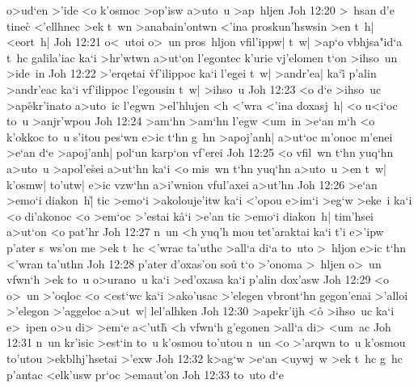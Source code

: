 o>ud`en
>'ide
<o
k'osmoc
>op'isw
a>uto~u
>ap~hljen\bibvsend
\vs Joh 12:20
>~hsan
d'e
tinec\r{}
<'ellhnec
>ek
t~wn
>anabain'ontwn
<'ina
proskun'hswsin
>en
t~h|
<eort~h|\bibvsend
\vs Joh 12:21
o<~utoi
o>~un
pros~hljon
vfil'ippw|
t~w|
>ap`o
vbhjsa"id`a
t~hc
galila'iac
ka`i
>hr'wtwn
a>ut`on
l'egontec
k'urie
vj'elomen
t`on
>ihso~un
>ide~in\bibvsend
\vs Joh 12:22
>'erqetai
\r{vf}'ilippoc
ka`i
l'egei
t~w|
>andr'ea|
ka`i\r{}
p'alin
>andr'eac
ka`i
vf'ilippoc
l'egousin
t~w|
>ihso~u\bibvsend
\vs Joh 12:23
<o
d`e
>ihso~uc
>ap\r{e}kr'inato
a>uto~ic
l'egwn
>el'hlujen
<h
<'wra
<'ina
doxasj~h|
<o
u<i`oc
to~u
>anjr'wpou\bibvsend
\vs Joh 12:24
>am`hn
>am`hn
l'egw
<um~in
>e`an
m`h
<o
k'okkoc
to~u
s'itou
pes`wn
e>ic
t`hn
g~hn
>apoj'anh|
a>ut`oc
m'onoc
m'enei
>e`an
d`e
>apoj'anh|
pol`un
karp`on
vf'erei\bibvsend
\vs Joh 12:25
<o
vfil~wn
t`hn
yuq`hn
a>uto~u
>apol'e\r{s}ei
a>ut`hn
ka`i
<o
mis~wn
t`hn
yuq`hn
a>uto~u
>en
t~w|
k'osmw|
to'utw|
e>ic
vzw`hn
a>i'wnion
vful'axei
a>ut'hn\bibvsend
\vs Joh 12:26
>e`an
>emo`i
diakon~h|\r{}
tic
>emo`i
>akolouje'itw
ka`i
<'opou
e>im`i
>eg`w
>eke~i
ka`i
<o
di'akonoc
<o
>em`oc
>'estai
k\r{a}`i
>e'an
tic
>emo`i
diakon~h|
tim'hsei
a>ut`on
<o
pat'hr\bibvsend
\vs Joh 12:27
n~un
<h
yuq'h
mou
tet'araktai
ka`i
t'i
e>'ipw
p'ater
s~ws'on
me
>ek
t~hc
<'wrac
ta'uthc
>all`a
di`a
to~uto
>~hljon
e>ic
t`hn
<'wran
ta'uthn\bibvsend
\vs Joh 12:28
p'ater
d'oxas'on
sou\r{}
t`o
>'onoma
>~hljen
o>~un
vfwn`h
>ek
to~u
o>urano~u
ka`i
>ed'oxasa
ka`i
p'alin
dox'asw\bibvsend
\vs Joh 12:29
<o
o>~un
>'oqloc
<o
<est`wc
ka`i
>ako'usac
>'elegen
vbront`hn
gegon'enai
>'alloi
>'elegon
>'aggeloc
a>ut~w|
lel'alhken\bibvsend
\vs Joh 12:30
>apekr'ijh
<o\r{}
>ihso~uc
ka`i
e>~ipen
o>u
di>
>em`e
a<'uth\r{}
<h
vfwn`h
g'egonen
>all`a
di>
<um~ac\bibvsend
\vs Joh 12:31
n~un
kr'isic
>est`in
to~u
k'osmou
to'utou
n~un
<o
>'arqwn
to~u
k'osmou
to'utou
>ekblhj'hsetai
>'exw\bibvsend
\vs Joh 12:32
k>ag`w
>e`an
<uywj~w
>ek
t~hc
g~hc
p'antac
<elk'usw
pr`oc
>emaut'on\bibvsend
\vs Joh 12:33
to~uto
d`e
